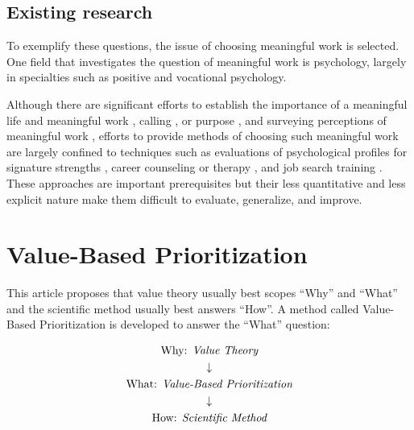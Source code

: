 \documentclass[10pt, a4paper, twocolumn]{IEEEconf}
\begin{document}
\subsection{Existing research}

To exemplify these questions, the issue of choosing meaningful work is selected. One field that investigates the question of meaningful work is psychology, largely in specialties such as positive and vocational psychology.

Although there are significant efforts to establish the importance of a meaningful life \citep{martela2016three,baumeister1991meanings,frankl1985man,baumeister2013some,park2013assessing,allan2015meaning,heintzelman2013knowing} and meaningful work \citep{steger2013experiencing,dik2009calling,oades2017wiley,steger2009if}, calling \citep{dik2012make}, or purpose \citep{george2013meaning}, and surveying perceptions of meaningful work \citep{steger2006meaning}, efforts to provide methods of choosing such meaningful work are largely confined to techniques such as evaluations of psychological profiles for signature strengths \citep{seligman2006learned}, career counseling \citep{dik2009calling} or therapy \citep{wong2010meaning}, and job search training \citep{zikic2009job}. These approaches are important prerequisites but their less quantitative and less explicit nature make them difficult to evaluate, generalize, and improve.

\section{Value-Based Prioritization}

This article proposes that value theory usually best scopes \enquote{Why} and \enquote{What} and the scientific method usually best answers \enquote{How}.
A method called Value-Based Prioritization is developed to answer the \enquote{What} question:

\begin{equation*}
  \begin{gathered}
    \textrm{Why: } \textit{Value Theory} \\
    \downarrow \\
    \textrm{What: } \textit{\textit{Value-Based Prioritization}} \\
    \downarrow \\
    \textrm{How: } \textit{Scientific Method}
  \end{gathered}
\end{equation*}
\end{document}
